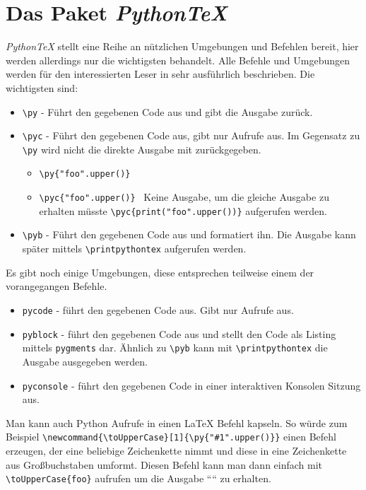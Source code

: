 \documentclass[11pt,a4paper]{article}
\newcommand{\toUpperCase}[1]{\py{"#1".upper()}}
\newcommand{\pythontex}{\textit{Python\TeX{}}}
\begin{document}
\section{Das Paket \pythontex{}}
\pythontex{} stellt eine Reihe an nützlichen Umgebungen und Befehlen bereit, hier werden allerdings nur die wichtigsten behandelt.
%
Alle Befehle und Umgebungen werden für den interessierten Leser in \cite{pythontex-paper} sehr ausführlich beschrieben.
%
Die wichtigsten sind:
%
\begin{itemize}
  \item \verb#\py# - Führt den gegebenen Code aus und gibt die Ausgabe zurück.
  \item \verb#\pyc# - Führt den gegebenen Code aus, gibt nur  Aufrufe aus. Im Gegensatz zu \verb#\py# wird nicht die direkte Ausgabe mit zurückgegeben.
  \begin{itemize}
    \item \verb#\py{"foo".upper()}# \textrightarrow\ 
    \item \verb#\pyc{"foo".upper()}# \textrightarrow\  Keine Ausgabe, um die gleiche Ausgabe zu erhalten müsste \verb#\pyc{print("foo".upper())}# aufgerufen werden.
  \end{itemize}
  \item \verb#\pyb# - Führt den gegebenen Code aus und formatiert ihn. Die Ausgabe kann später mittels \verb#\printpythontex# aufgerufen werden.
\end{itemize}
%
Es gibt noch einige Umgebungen, diese entsprechen teilweise einem der vorangegangen Befehle.
\begin{itemize}
  \item \texttt{pycode} - führt den gegebenen Code aus. Gibt nur  Aufrufe aus.
  \item \texttt{pyblock} - führt den gegebenen Code aus und stellt den Code als Listing mittels \texttt{pygments} dar. Ähnlich zu \verb#\pyb# kann mit \verb#\printpythontex# die Ausgabe ausgegeben werden.
  \item \texttt{pyconsole} - führt den gegebenen Code in einer interaktiven Konsolen Sitzung aus.
\end{itemize}
%
Man kann auch Python Aufrufe in einen \LaTeX{} Befehl kapseln.
%
So würde zum Beispiel \verb~\newcommand{\toUpperCase}[1]{\py{"#1".upper()}}~ einen Befehl erzeugen, der eine beliebige Zeichenkette nimmt und diese in eine Zeichenkette aus Großbuchstaben umformt.
%
Diesen Befehl kann man dann einfach mit \verb#\toUpperCase{foo}# aufrufen um die Ausgabe ``\toUpperCase{foo}`` zu erhalten.
\end{document}
